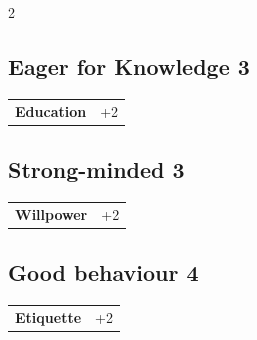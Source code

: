 \begin{multicols}{2}
\begin{tcolorbox}
\vspace{3mm}



\end{tcolorbox}

\begin{tcolorbox}
    \subsection*{Eager for Knowledge \hfill \small{3 }}
    \tcblower




\begin{tabular}{@{}ll@{}}
    \textbf{Education} & +2\\
\end{tabular}


\end{tcolorbox}

\begin{tcolorbox}
    \subsection*{Strong-minded \hfill \small{3 }}
    \tcblower




\begin{tabular}{@{}ll@{}}
    \textbf{Willpower} & +2\\
\end{tabular}


\end{tcolorbox}

\begin{tcolorbox}
    \subsection*{Good behaviour \hfill \small{4 }}
    \tcblower




\begin{tabular}{@{}ll@{}}
    \textbf{Etiquette} & +2\\
\end{tabular}


\end{tcolorbox}
\end{multicols}
